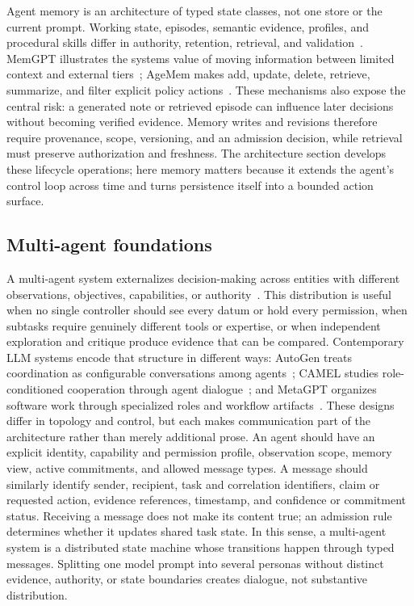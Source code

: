 Agent memory is an architecture of typed state classes, not one store or the current prompt. Working state, episodes, semantic evidence, profiles, and procedural skills differ in authority, retention, retrieval, and validation~\cite{zhang2025memorysurvey}. MemGPT illustrates the systems value of moving information between limited context and external tiers~\cite{packer2024memgpt}; AgeMem makes add, update, delete, retrieve, summarize, and filter explicit policy actions~\cite{yu2026agemem}. These mechanisms also expose the central risk: a generated note or retrieved episode can influence later decisions without becoming verified evidence. Memory writes and revisions therefore require provenance, scope, versioning, and an admission decision, while retrieval must preserve authorization and freshness. The architecture section develops these lifecycle operations; here memory matters because it extends the agent's control loop across time and turns persistence itself into a bounded action surface.

\subsection{Multi-agent foundations}

A multi-agent system externalizes decision-making across entities with different observations, objectives, capabilities, or authority~\cite{wooldridge2009multiagent}. This distribution is useful when no single controller should see every datum or hold every permission, when subtasks require genuinely different tools or expertise, or when independent exploration and critique produce evidence that can be compared. Contemporary LLM systems encode that structure in different ways: AutoGen treats coordination as configurable conversations among agents~\cite{wu2023autogen}; CAMEL studies role-conditioned cooperation through agent dialogue~\cite{li2023camel}; and MetaGPT organizes software work through specialized roles and workflow artifacts~\cite{hong2024metagpt}. These designs differ in topology and control, but each makes communication part of the architecture rather than merely additional prose. An agent should have an explicit identity, capability and permission profile, observation scope, memory view, active commitments, and allowed message types. A message should similarly identify sender, recipient, task and correlation identifiers, claim or requested action, evidence references, timestamp, and confidence or commitment status. Receiving a message does not make its content true; an admission rule determines whether it updates shared task state. In this sense, a multi-agent system is a distributed state machine whose transitions happen through typed messages. Splitting one model prompt into several personas without distinct evidence, authority, or state boundaries creates dialogue, not substantive distribution.

